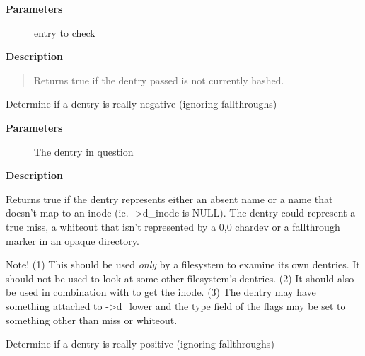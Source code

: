 \documentclass[a4paper,8pt,english]{sphinxmanual}
\begin{document}
\textbf{Parameters}
\begin{description}
\item[{}] \leavevmode
entry to check

\end{description}

\textbf{Description}
\begin{quote}

Returns true if the dentry passed is not currently hashed.
\end{quote}

\begin{fulllineitems}
\label{filesystems/index:c.d_really_is_negative}
Determine if a dentry is really negative (ignoring fallthroughs)

\end{fulllineitems}


\textbf{Parameters}
\begin{description}
\item[{}] \leavevmode
The dentry in question

\end{description}

\textbf{Description}

Returns true if the dentry represents either an absent name or a name that
doesn't map to an inode (ie. -\textgreater{}d\_inode is NULL).  The dentry could represent
a true miss, a whiteout that isn't represented by a 0,0 chardev or a
fallthrough marker in an opaque directory.

Note!  (1) This should be used \emph{only} by a filesystem to examine its own
dentries.  It should not be used to look at some other filesystem's
dentries.  (2) It should also be used in combination with {\hyperref[filesystems/index:c.d_inode]{\emph{}}} to get
the inode.  (3) The dentry may have something attached to -\textgreater{}d\_lower and the
type field of the flags may be set to something other than miss or whiteout.

\begin{fulllineitems}
\label{filesystems/index:c.d_really_is_positive}
Determine if a dentry is really positive (ignoring fallthroughs)

\end{fulllineitems}
\end{document}
